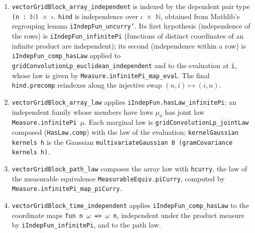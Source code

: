\documentclass[11pt,a4paper]{article}
\begin{document}
\begin{leanbox}
\begin{enumerate}
\item \texttt{vector\allowbreak{}Grid\allowbreak{}Block\_\allowbreak{}array\_\allowbreak{}independent} is indexed by the dependent pair type \texttt{(n : \ensuremath{\mathbb N}) \ensuremath{\times} \ensuremath{\iota}}. \texttt{hind} is independence over \texttt{\ensuremath{\iota} \ensuremath{\times} \ensuremath{\mathbb N}}, obtained from Mathlib's regrouping lemma \texttt{i\allowbreak{}Indep\allowbreak{}Fun\_\allowbreak{}uncurry'}. Its first hypothesis (independence of the rows) is \texttt{i\allowbreak{}Indep\allowbreak{}Fun\_\allowbreak{}infinite\allowbreak{}Pi} (functions of distinct coordinates of an infinite product are independent); its second (independence within a row) is \texttt{i\allowbreak{}Indep\allowbreak{}Fun\_\allowbreak{}comp\_\allowbreak{}has\allowbreak{}Law} applied to \texttt{grid\allowbreak{}Convolution\allowbreak{}Lp\_\allowbreak{}euclidean\_\allowbreak{}independent} and to the evaluation at \texttt{i}, whose law is given by \texttt{Measure.\allowbreak{}infinite\allowbreak{}Pi\_\allowbreak{}map\_\allowbreak{}eval}. The final \texttt{hind.\allowbreak{}precomp} reindexes along the injective swap \((n,i)\mapsto(i,n)\).

\item \texttt{vector\allowbreak{}Grid\allowbreak{}Block\_\allowbreak{}array\_\allowbreak{}law} applies \texttt{i\allowbreak{}Indep\allowbreak{}Fun.\allowbreak{}has\allowbreak{}Law\_\allowbreak{}infinite\allowbreak{}Pi}: an independent family whose members have laws \(\mu_a\) has joint law \texttt{Measure.\allowbreak{}infinite\allowbreak{}Pi \ensuremath{\mu}}. Each marginal law is \texttt{grid\allowbreak{}Convolution\allowbreak{}Lp\_\allowbreak{}joint\allowbreak{}Law} composed (\texttt{Has\allowbreak{}Law.\allowbreak{}comp}) with the law of the evaluation; \texttt{kernel\allowbreak{}Gaussian kernels h} is the Gaussian \texttt{multivariate\allowbreak{}Gaussian 0 (gram\allowbreak{}Covariance kernels h)}.

\item \texttt{vector\allowbreak{}Grid\allowbreak{}Block\_\allowbreak{}path\_\allowbreak{}law} composes the array law with \texttt{hcurry}, the law of the measurable equivalence \texttt{Measurable\allowbreak{}Equiv.\allowbreak{}pi\allowbreak{}Curry}, computed by \texttt{Measure.\allowbreak{}infinite\allowbreak{}Pi\_\allowbreak{}map\_\allowbreak{}pi\allowbreak{}Curry}.

\item \texttt{vector\allowbreak{}Grid\allowbreak{}Block\_\allowbreak{}time\_\allowbreak{}independent} applies \texttt{i\allowbreak{}Indep\allowbreak{}Fun\_\allowbreak{}comp\_\allowbreak{}has\allowbreak{}Law} to the coordinate maps \texttt{fun n \ensuremath{\omega} => \ensuremath{\omega} n}, independent under the product measure by \texttt{i\allowbreak{}Indep\allowbreak{}Fun\_\allowbreak{}infinite\allowbreak{}Pi}, and to the path law.

\end{enumerate}
\end{leanbox}
\end{document}
